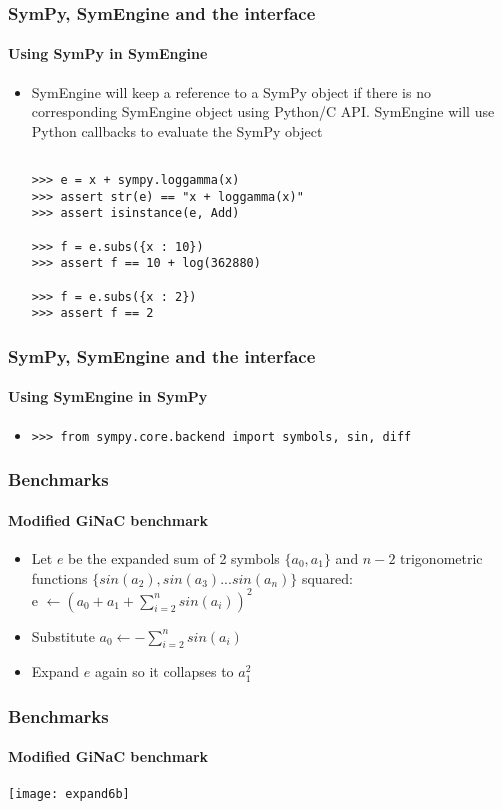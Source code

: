 \documentclass{beamer}
\begin{document}
\begin{frame}[fragile]
\frametitle{SymPy, SymEngine and the interface}
\framesubtitle{Using SymPy in SymEngine}
\begin{itemize}
\item
SymEngine will keep a reference to a SymPy object if there is no corresponding SymEngine object using Python/C API.
SymEngine will use Python callbacks to evaluate the SymPy object

\begin{verbatim}

>>> e = x + sympy.loggamma(x)
>>> assert str(e) == "x + loggamma(x)"
>>> assert isinstance(e, Add)

>>> f = e.subs({x : 10})
>>> assert f == 10 + log(362880)

>>> f = e.subs({x : 2})
>>> assert f == 2
\end{verbatim}
\end{itemize}
\end{frame}


\begin{frame}[fragile]
\frametitle{SymPy, SymEngine and the interface}
\framesubtitle{Using SymEngine in SymPy}
\begin{itemize}
\item
\begin{verbatim}
>>> from sympy.core.backend import symbols, sin, diff
\end{verbatim}
\end{itemize}
\end{frame}




\begin{frame}
\frametitle{Benchmarks}
\framesubtitle{Modified GiNaC benchmark}
\begin{itemize}  
\item Let $e$ be the expanded sum of 2 symbols $\{a_0, a_1\}$ and $n-2$ trigonometric functions $\{sin(a_2), sin(a_3)...sin(a_n)\}$ squared:\\
e $\leftarrow (a_0+a_1+\sum_{i=2}^{n} sin(a_i))^2$    
\item Substitute $a_0 \leftarrow -\sum_{i=2}^{n} sin(a_i)$ 
\item Expand $e$ again so it collapses to $a_1^2$
\end{itemize}
\end{frame}


\begin{frame}
\frametitle{Benchmarks}
\framesubtitle{Modified GiNaC benchmark}
\texttt{[image: expand6b]}
\end{frame}
\end{document}
